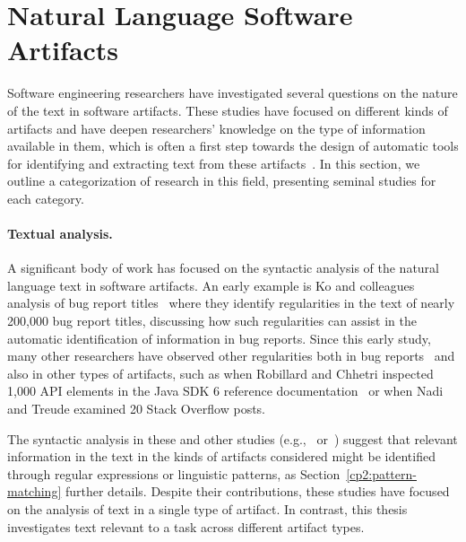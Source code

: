 \section{Natural Language Software Artifacts}
\label{cp2:text-in-se}





Software engineering researchers
have investigated several questions on the nature of the text in software artifacts.
These studies 
have focused on different kinds of artifacts and have deepen
 researchers' knowledge on the type of information available in them,
 which is often a first step towards the design of automatic tools 
for identifying and extracting text from these artifacts~\cite{Arya2019, Maalej2013}.
In this section, we outline a categorization of research in this field, presenting 
seminal studies for each category.



\paragraph{\textbf{Textual analysis.}} A significant body of work has 
focused on the syntactic analysis of the natural language text 
in software artifacts. An early example
is Ko and colleagues analysis of bug report titles~\cite{Ko2006}
where they identify regularities in the text of nearly 200,000 bug report titles,
discussing how such regularities can 
assist in the automatic identification 
of information in bug reports. 
Since this early study, many other researchers have 
observed other regularities both in bug reports~\cite{Rastkar2010, Chaparro2016}
and also in other types of artifacts, such as 
when Robillard  and Chhetri inspected 1,000 API elements in the Java SDK 6 
reference documentation~\cite{Maalej2013} or when 
Nadi and Treude examined 20 Stack Overflow posts.


The syntactic analysis in these and other studies (e.g.,~\cite{chaparro2019} or~\cite{lin2019})
suggest that relevant information in the text  
in the kinds of artifacts considered 
might be identified through regular expressions or 
linguistic patterns, as Section~\ref{cp2:pattern-matching} further details.
Despite their contributions, these studies have focused on the analysis of 
text in a single type of artifact. In contrast, this thesis investigates 
text relevant to a task across different artifact types.






